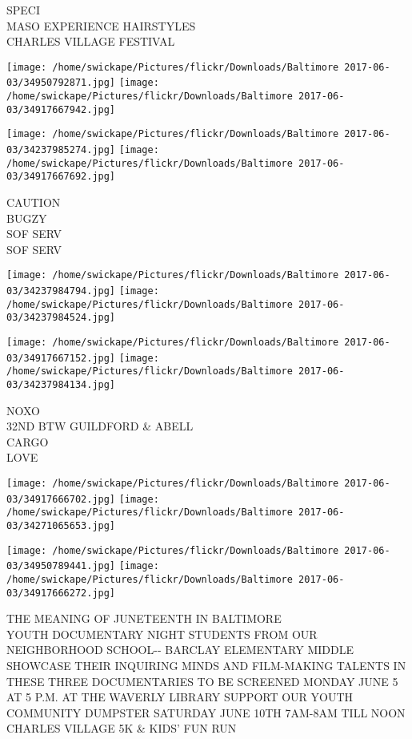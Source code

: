 \documentclass[10pt,letterpaper]{article}
\begin{document}
SPECI\\
MASO EXPERIENCE HAIRSTYLES\\
CHARLES VILLAGE FESTIVAL
\pagebreak

\texttt{[image: /home/swickape/Pictures/flickr/Downloads/Baltimore 2017-06-03/34950792871.jpg]}
\texttt{[image: /home/swickape/Pictures/flickr/Downloads/Baltimore 2017-06-03/34917667942.jpg]}

\texttt{[image: /home/swickape/Pictures/flickr/Downloads/Baltimore 2017-06-03/34237985274.jpg]}
\texttt{[image: /home/swickape/Pictures/flickr/Downloads/Baltimore 2017-06-03/34917667692.jpg]}

CAUTION\\
BUGZY\\
SOF SERV\\
SOF SERV
\pagebreak

\texttt{[image: /home/swickape/Pictures/flickr/Downloads/Baltimore 2017-06-03/34237984794.jpg]}
\texttt{[image: /home/swickape/Pictures/flickr/Downloads/Baltimore 2017-06-03/34237984524.jpg]}

\texttt{[image: /home/swickape/Pictures/flickr/Downloads/Baltimore 2017-06-03/34917667152.jpg]}
\texttt{[image: /home/swickape/Pictures/flickr/Downloads/Baltimore 2017-06-03/34237984134.jpg]}

NOXO\\
32ND BTW GUILDFORD \& ABELL\\
CARGO\\
LOVE
\pagebreak

\texttt{[image: /home/swickape/Pictures/flickr/Downloads/Baltimore 2017-06-03/34917666702.jpg]}
\texttt{[image: /home/swickape/Pictures/flickr/Downloads/Baltimore 2017-06-03/34271065653.jpg]}

\texttt{[image: /home/swickape/Pictures/flickr/Downloads/Baltimore 2017-06-03/34950789441.jpg]}
\texttt{[image: /home/swickape/Pictures/flickr/Downloads/Baltimore 2017-06-03/34917666272.jpg]}

THE MEANING OF JUNETEENTH IN BALTIMORE\\
YOUTH DOCUMENTARY NIGHT STUDENTS FROM OUR NEIGHBORHOOD SCHOOL{-}{-} BARCLAY ELEMENTARY MIDDLE  SHOWCASE THEIR INQUIRING MINDS AND FILM{-}MAKING TALENTS IN THESE THREE DOCUMENTARIES TO BE SCREENED MONDAY JUNE 5 AT 5 P.M. AT THE WAVERLY LIBRARY SUPPORT OUR YOUTH\\
COMMUNITY DUMPSTER SATURDAY JUNE 10TH 7AM{-}8AM TILL NOON\\
CHARLES VILLAGE 5K \& KIDS' FUN RUN
\pagebreak
\end{document}
